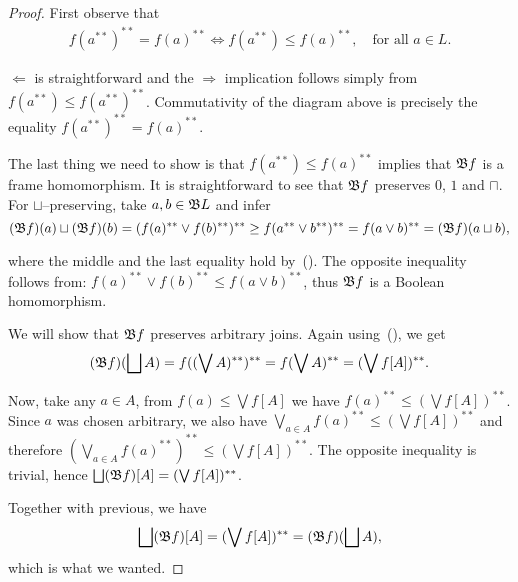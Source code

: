 \begin{proof}
    First observe that
    \begin{align}
        f(a^{**})^{**} = f(a)^{**} \iff f(a^{**}) \leq f(a)^{**},\quad\text{for all } a\in L.\label{e:2202iff20leq02}\tag{W.O.}
    \end{align}

    $\Leftarrow$ is straightforward and the $\Rightarrow$ implication follows simply from $f(a^{**}) \leq f(a^{**})^{**} $. Commutativity of the diagram above is precisely the equality $f(a^{**})^{**} = f(a)^{**}$.

    The last thing we need to show is that $f(a^{**}) \leq f(a)^{**}$ implies that $\mathfrak{B} f$ is a frame homomorphism. It is straightforward to see that $\mathfrak{B} f$ preserves $0$, $1$ and $\sqcap$. For $\sqcup$--preserving, take $a, b \in \mathfrak{B} L$ and infer
    $$(\mathfrak{B} f)(a)\sqcup (\mathfrak{B} f)(b) = (f(a)^{**}\vee f(b)^{**})^{**} \geq f(a^{**}\vee b^{**})^{**} = f(a\vee b)^{**} = (\mathfrak{B} f)(a\sqcup b),$$

    \noindent where the middle and the last equality hold by~(). The opposite inequality follows from: $f(a)^{**}\vee f(b)^{**}\leq f(a\vee b)^{**}$, thus $\mathfrak{B} f$ is a Boolean homomorphism.

    We will show that $\mathfrak{B} f$ preserves arbitrary joins. Again using~(), we get
    $$ (\mathfrak{B} f)(\bigsqcup A) = f((\bigvee A)^{**})^{**} = f(\bigvee A)^{**} = (\bigvee f[A])^{**}. $$

    Now, take any $a\in A$, from $f(a) \leq \bigvee f[A]$ we have $f(a)^{**} \leq (\bigvee f[A])^{**}$. Since $a$ was chosen arbitrary, we also have $\bigvee_{a\in A} f(a)^{**} \leq (\bigvee f[A])^{**}$ and therefore $(\bigvee_{a\in A} f(a)^{**})^{**} \leq (\bigvee f[A])^{**}$. The opposite inequality is trivial, hence $\bigsqcup (\mathfrak{B} f)[A] = (\bigvee f[A])^{**}$.

    Together with previous, we have
    $$ \bigsqcup (\mathfrak{B} f)[A] = (\bigvee f[A])^{**} = (\mathfrak{B} f)(\bigsqcup A),$$
    \noindent which is what we wanted.
\end{proof}

